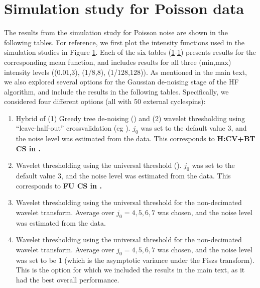 \documentclass[12pt]{article}
\begin{document}
\section{Simulation study for Poisson data}
The results from the simulation study for Poisson noise are shown in the following tables. For reference, we first plot the intensity functions used in the simulation studies in Figure \ref{}. Each of the six tables (\ref{}-\ref{}) presents results for the corresponding mean function, and includes results for all three (min,max) intensity levels ((0.01,3), (1/8,8), (1/128,128)). As mentioned in the main text, we also explored several options for the Gaussian de-noising stage of the HF algorithm, and include the results in the following tables. Specifically, we considered four different options (all with 50 external cyclespins):
\begin{enumerate}
\item Hybrid of (1) Greedy tree de-noising (\cite{Baraniuk1999Optimal}) and (2) wavelet thresholding using ``leave-half-out'' crossvalidation (eg \cite{Nason1995Choice}). $j_0$ was set to the default value 3, and the noise level was estimated from the data. This corresponds to \bf{H:CV+BT CS} in \cite{Fryzlewicz2004HaarFisz}.
\item Wavelet thresholding using the universal threshold (\cite{Donoho1994Ideal}). $j_0$ was set to the default value 3, and the noise level was estimated from the data. This corresponds to \bf{F\bowtie U CS} in \cite{Fryzlewicz2004HaarFisz}.
\item Wavelet thresholding using the universal threshold for the non-decimated wavelet transform. Average over $j_0=4,5,6,7$ was chosen, and the noise level was estimated from the data.
\item Wavelet thresholding using the universal threshold for the non-decimated wavelet transform. Average over $j_0=4,5,6,7$ was chosen, and the noise level was set to be 1 (which is the asymptotic variance under the Fiszs transform). This is the option for which we included the results in the main text, as it had the best overall performance.
\end{enumerate}
\end{document}

